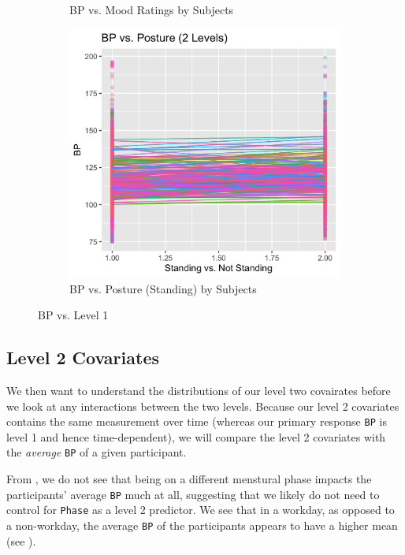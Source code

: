 \documentclass[12pt,twoside,letterpaper]{article}
\theoremstyle{definition}
\theoremstyle{definition}
\begin{document}
\begin{figure}
\begin{subfigure}[b]{0.32\textwidth}
    \caption[]%
    {{\small BP vs. Mood Ratings by Subjects}}
    \label{fig: bp v mood}
    \end{subfigure}
    \hfill
    \begin{subfigure}[b]{0.32\textwidth}
    \centering
    \includegraphics[width=\textwidth]{pics/bp v stand.png}
    \caption[]%
    {{\small BP vs. Posture (Standing) by Subjects}}
    \label{fig: bp v stand}
    \end{subfigure}
    \caption[]
    {\small BP vs. Level 1}
    \label{fig: bp v level1}
    \end{figure}

\subsection{Level 2 Covariates}\label{sec: lv2}

We then want to understand the distributions of our level two covairates before we look at any interactions between the two levels. Because our level 2 covariates contains the same measurement over time (whereas our primary response \texttt{BP} is level 1 and hence time-dependent), we will compare the level 2 covariates with the \emph{average} \texttt{BP} of a given participant. 

From , we do not see that being on a different menstural phase impacts the participants' average \texttt{BP} much at all, suggesting that we likely do not need to control for \texttt{Phase} as a level 2 predictor. We see that in a workday, as opposed to a non-workday, the average \texttt{BP} of the participants appears to have a higher mean (see ). 
\end{document}
